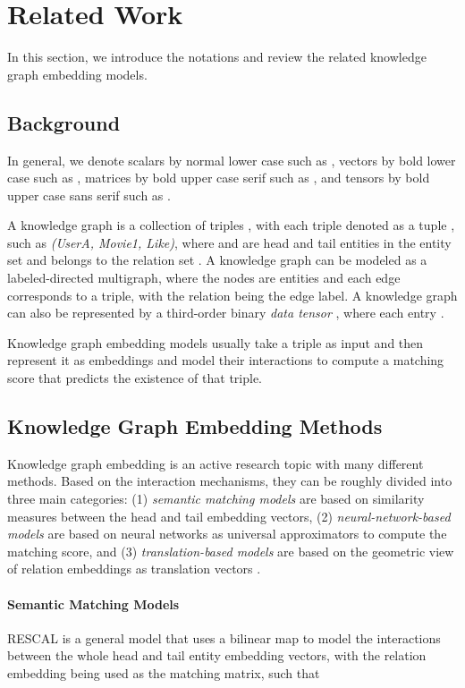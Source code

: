\documentclass{ecai}
\theoremstyle{plain}  \newtheorem{thm}{Theorem}  \newtheorem{lem}[thm]{Lemma}  \newtheorem{prop}[thm]{Proposition}
\theoremstyle{remark}  \newtheorem*{rem}{Remark}
\begin{document}
\section{Related Work} \label{sect:relatedwork} In this section, we introduce the notations and review the related knowledge graph embedding models.

\subsection{Background} \label{sect:background} In general, we denote scalars by normal lower case such as , vectors by bold lower case such as , matrices by bold upper case serif such as , and tensors by bold upper case sans serif such as . 

A knowledge graph is a collection of triples , with each triple denoted as a tuple , such as \textit{(UserA, Movie1, Like)}, where  and  are head and tail entities in the entity set  and  belongs to the relation set . A knowledge graph can be modeled as a labeled-directed multigraph, where the nodes are entities and each edge corresponds to a triple, with the relation being the edge label. A knowledge graph can also be represented by a third-order binary \textit{data tensor} , where each entry .

Knowledge graph embedding models usually take a triple  as input and then represent it as embeddings and model their interactions to compute a matching score  that predicts the existence of that triple. 

\subsection{Knowledge Graph Embedding Methods} Knowledge graph embedding is an active research topic with many different methods. Based on the interaction mechanisms, they can be roughly divided into three main categories: (1) \textit{semantic matching models} are based on similarity measures between the head and tail embedding vectors, (2) \textit{neural-network-based models} are based on neural networks as universal approximators to compute the matching score, and (3) \textit{translation-based models} are based on the geometric view of relation embeddings as translation vectors \cite{tran_analyzingknowledgegraph_2019,wang_knowledgegraphembedding_2017}.

\paragraph{Semantic Matching Models}
RESCAL \cite{nickel_threewaymodelcollective_2011} is a general model that uses a bilinear map to model the interactions between the whole head and tail entity embedding vectors, with the relation embedding being used as the matching matrix, such that 
\end{document}
